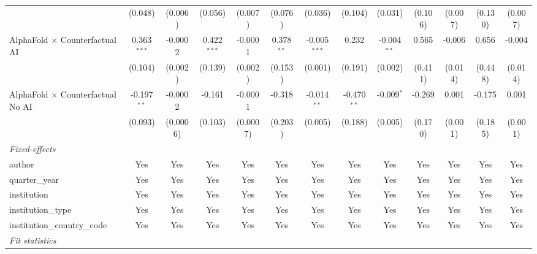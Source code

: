 \begin{tabular}{lcccccccccccc}
                                            & (0.048)       & (0.006)  & (0.056)       & (0.007)  & (0.076)       & (0.036)        & (0.104)       & (0.031)       & (0.106) & (0.007) & (0.130) & (0.007)\\   
   AlphaFold $\times$ Counterfactual AI     & 0.363$^{***}$ & -0.0002  & 0.422$^{***}$ & -0.0001  & 0.378$^{**}$  & -0.005$^{***}$ & 0.232         & -0.004$^{**}$ & 0.565   & -0.006  & 0.656   & -0.004\\   
                                            & (0.104)       & (0.002)  & (0.139)       & (0.002)  & (0.153)       & (0.001)        & (0.191)       & (0.002)       & (0.411) & (0.014) & (0.448) & (0.014)\\   
   AlphaFold $\times$ Counterfactual No AI  & -0.197$^{**}$ & -0.0002  & -0.161        & -0.0001  & -0.318        & -0.014$^{**}$  & -0.470$^{**}$ & -0.009$^{*}$  & -0.269  & 0.001   & -0.175  & 0.001\\   
                                            & (0.093)       & (0.0006) & (0.103)       & (0.0007) & (0.203)       & (0.005)        & (0.188)       & (0.005)       & (0.170) & (0.001) & (0.185) & (0.001)\\   
   \midrule
   \emph{Fixed-effects}\\
   author                                   & Yes           & Yes      & Yes           & Yes      & Yes           & Yes            & Yes           & Yes           & Yes     & Yes     & Yes     & Yes\\  
   quarter\_year                            & Yes           & Yes      & Yes           & Yes      & Yes           & Yes            & Yes           & Yes           & Yes     & Yes     & Yes     & Yes\\  
   institution                              & Yes           & Yes      & Yes           & Yes      & Yes           & Yes            & Yes           & Yes           & Yes     & Yes     & Yes     & Yes\\  
   institution\_type                        & Yes           & Yes      & Yes           & Yes      & Yes           & Yes            & Yes           & Yes           & Yes     & Yes     & Yes     & Yes\\  
   institution\_country\_code               & Yes           & Yes      & Yes           & Yes      & Yes           & Yes            & Yes           & Yes           & Yes     & Yes     & Yes     & Yes\\  
   \midrule
   \emph{Fit statistics}\\

\end{tabular}
